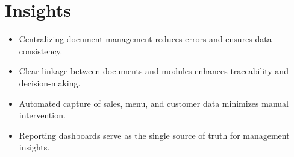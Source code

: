 \section*{Insights}

\begin{itemize}
    \item Centralizing document management reduces errors and ensures data consistency.
    \item Clear linkage between documents and modules enhances traceability and decision-making.
    \item Automated capture of sales, menu, and customer data minimizes manual intervention.
    \item Reporting dashboards serve as the single source of truth for management insights.
\end{itemize}
